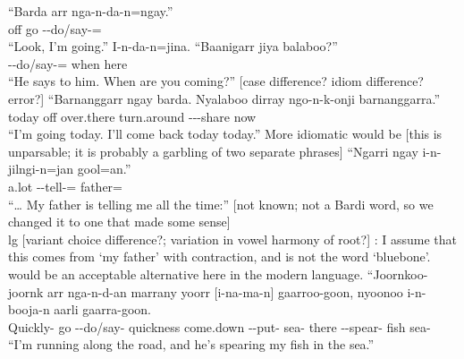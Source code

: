 \begin{exye}
\exy {}
\gll ``Barda arr nga-n-da-n=ngay.''\\
off go --do/say-=\\
\ft ``Look, I'm going.''
\exy {}
\gll I-n-da-n=jina. ``Baanigarr jiya balaboo?''\\
--do/say-= when  here\\
\ft ``He says to him. When are you coming?''
\llg {} [case difference? idiom difference? error?]
\exy {}
\gll ``Barnanggarr ngay barda. Nyalaboo dirray ngo-n-k-onji barnanggarra.''\\
today  off over.there turn.around ---share now\\
\ft ``I'm going today. I'll come back today today.''
\nt More idiomatic would be 
\llg {} [this is unparsable; it is probably a garbling of two separate phrases]
\exy {}
\gll ``Ngarri ngay i-n-jilngi-n=jan gool=an.''\\
a.lot  --tell-= father=\\
\ft ``{\dots} My father is telling me all the time:''
\llg {} [not known; not a Bardi word, so we changed it to one that made some sense] \\lg {} [variant choice
difference?; variation in vowel harmony of root?] 
\nt {}: I assume that this comes from  `my father' with contraction, and is
not the word  `bluebone'.  would be an acceptable alternative here in the modern language.%
\exy {}
\gll ``Joornkoo-joornk arr nga-n-d-an marrany yoorr [i-na-ma-n] gaarroo-goon, nyoonoo i-n-booja-n aarli gaarra-goon.\\
Quickly- go --do/say- quickness come.down --put- sea- there --spear- fish sea-\\
\ft ``I'm running along the road, and he's spearing my fish in the sea.''

\end{exye}
